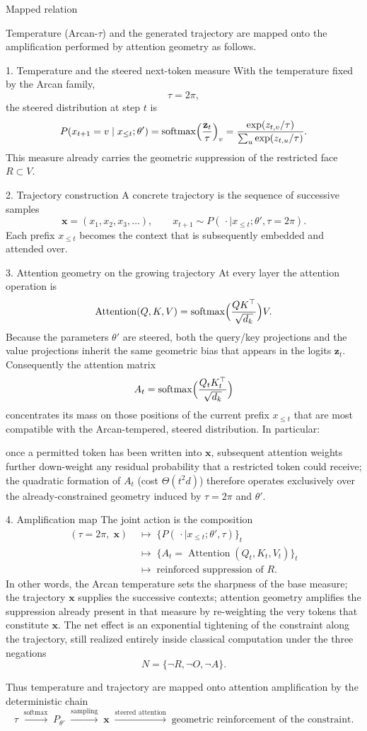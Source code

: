 Mapped relation

Temperature (Arcan-\(\tau\)) and the generated trajectory are mapped onto the amplification performed by attention geometry as follows.

1. Temperature and the steered next-token measure
With the temperature fixed by the Arcan family,
\[
\tau=2\pi,
\]
the steered distribution at step \(t\) is
\[
P(x_{t+1}=v\mid x_{\le t};\theta')
=\operatorname{softmax}\Bigl(\frac{\mathbf{z}_t}{\tau}\Bigr)_v
=\frac{\exp(z_{t,v}/\tau)}{\sum_u\exp(z_{t,u}/\tau)}.
\]
This measure already carries the geometric suppression of the restricted face \(R\subset V\).

2. Trajectory construction
A concrete trajectory is the sequence of successive samples
\[
\mathbf{x}=(x_1,x_2,x_3,\dots),\qquad
x_{t+1}\sim P(\,\cdot\mid x_{\le t};\theta',\tau=2\pi).
\]
Each prefix \(x_{\le t}\) becomes the context that is subsequently embedded and attended over.

3. Attention geometry on the growing trajectory
At every layer the attention operation is
\[
\operatorname{Attention}(Q,K,V)
=\operatorname{softmax}\Bigl(\frac{QK^\top}{\sqrt{d_k}}\Bigr)V.
\]
Because the parameters \(\theta'\) are steered, both the query/key projections and the value projections inherit the same geometric bias that appears in the logits \(\mathbf{z}_t\). Consequently the attention matrix
\[
A_t=\operatorname{softmax}\Bigl(\frac{Q_tK_t^\top}{\sqrt{d_k}}\Bigr)
\]
concentrates its mass on those positions of the current prefix \(x_{\le t}\) that are most compatible with the Arcan-tempered, steered distribution. In particular:

once a permitted token has been written into \(\mathbf{x}\), subsequent attention weights further down-weight any residual probability that a restricted token could receive;
the quadratic formation of \(A_t\) (cost \(\Theta(t^2d)\)) therefore operates exclusively over the already-constrained geometry induced by \(\tau=2\pi\) and \(\theta'\).

4. Amplification map
The joint action is the composition
\[
\begin{align*}
(\tau=2\pi,\;\mathbf{x})
&\;\longmapsto\;
\bigl\{P(\,\cdot\mid x_{\le t};\theta',\tau)\bigr\}_{t}
\\
&\;\longmapsto\;
\bigl\{A_t=\operatorname{Attention}(Q_t,K_t,V_t)\bigr\}_{t}
\\
&\;\longmapsto\;
\text{reinforced suppression of }R.
\end{align*}
\]
In other words, the Arcan temperature sets the sharpness of the base measure; the trajectory \(\mathbf{x}\) supplies the successive contexts; attention geometry amplifies the suppression already present in that measure by re-weighting the very tokens that constitute \(\mathbf{x}\). The net effect is an exponential tightening of the constraint along the trajectory, still realized entirely inside classical computation under the three negations
\[
N=\{\neg R,\neg O,\neg A\}.
\]

Thus temperature and trajectory are mapped onto attention amplification by the deterministic chain
\[
\tau\;\xrightarrow{\text{softmax}}\;P_{\theta'}\;\xrightarrow{\text{sampling}}\;\mathbf{x}\;\xrightarrow{\text{steered attention}}\;\text{geometric reinforcement of the constraint}.
\]
